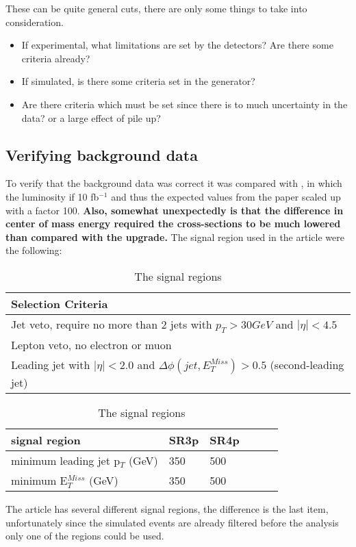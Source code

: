 These can be quite general cuts, there are only some things to take into consideration. 
\begin{itemize}
\item If experimental, what limitations are set by the detectors? Are there some criteria already?
\item If simulated, is there some criteria set in the generator?
\item Are there criteria which must be set since there is to much uncertainty in the data? or a large effect of pile up?
\end{itemize}


\subsection{Verifying background data} 	
To verify that the background data was correct it was compared with \citep{ATLAS-CONF-2012-147}, in which the luminosity if 10 fb$^{-1}$ and thus the expected values from the paper scaled up with a factor 100. \textbf{Also, somewhat unexpectedly is that the difference in center of mass energy required the cross-sections to be much lowered than compared with the upgrade.} The signal region used in the article were the following:
\begin{table}[h]
\begin{center}
\begin{tabular}{l}
\hline
Selection Criteria \\ \hline
Jet veto, require no more than 2 jets with $p_T > 30 GeV$ and $|\eta| < 4.5$ \\
Lepton veto, no electron or muon \\
Leading jet with $|\eta| < 2.0$ and $\Delta \phi (jet, E_T^{Miss})>0.5$ (second-leading jet) \\ \hline
\end{tabular}
\begin{tabular}{l l l l l l}
signal region & SR3p & SR4p \\ \hline
minimum leading jet p$_T$ (GeV) & 350 & 500 \\
minimum E$^{Miss}_T$ (GeV) & 350 & 500 \\ \hline
\end{tabular}
\label{tab:oldsr}
\caption{The signal regions}
\end{center}
\end{table}






The article has several different signal regions, the difference is the last item, unfortunately since the simulated events are already filtered before the analysis only one of the regions could be used.

